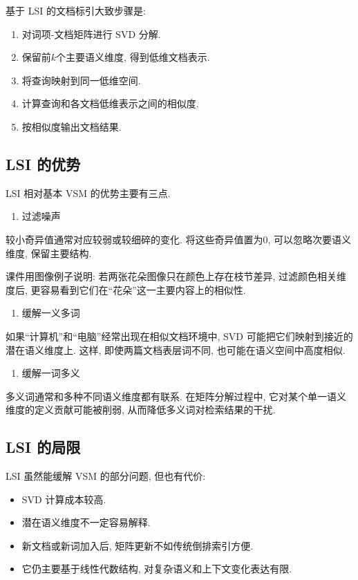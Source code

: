 基于 LSI 的文档标引大致步骤是:

\begin{enumerate}
\item[1.] 对词项-文档矩阵进行 SVD 分解.
\item[2.] 保留前$k$个主要语义维度, 得到低维文档表示.
\item[3.] 将查询映射到同一低维空间.
\item[4.] 计算查询和各文档低维表示之间的相似度.
\item[5.] 按相似度输出文档结果.
\end{enumerate}

\subsection{LSI 的优势}


LSI 相对基本 VSM 的优势主要有三点.

\begin{enumerate}
\item[1.] 过滤噪声
\end{enumerate}

较小奇异值通常对应较弱或较细碎的变化.
将这些奇异值置为$0$, 可以忽略次要语义维度, 保留主要结构.

课件用图像例子说明:
若两张花朵图像只在颜色上存在枝节差异,
过滤颜色相关维度后, 更容易看到它们在“花朵”这一主要内容上的相似性.

\begin{enumerate}
\item[2.] 缓解一义多词
\end{enumerate}

如果“计算机”和“电脑”经常出现在相似文档环境中,
SVD 可能把它们映射到接近的潜在语义维度上.
这样, 即使两篇文档表层词不同, 也可能在语义空间中高度相似.

\begin{enumerate}
\item[3.] 缓解一词多义
\end{enumerate}

多义词通常和多种不同语义维度都有联系.
在矩阵分解过程中, 它对某个单一语义维度的定义贡献可能被削弱,
从而降低多义词对检索结果的干扰.

\subsection{LSI 的局限}


LSI 虽然能缓解 VSM 的部分问题, 但也有代价:

\begin{itemize}
\item SVD 计算成本较高.
\item 潜在语义维度不一定容易解释.
\item 新文档或新词加入后, 矩阵更新不如传统倒排索引方便.
\item 它仍主要基于线性代数结构, 对复杂语义和上下文变化表达有限.
\end{itemize}

